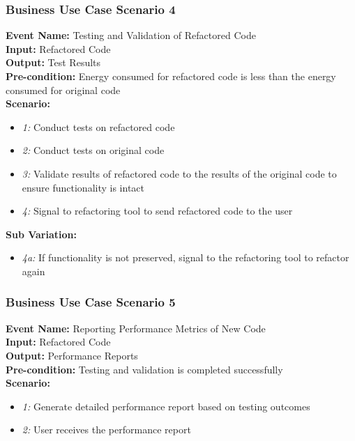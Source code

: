 \documentclass[12pt]{article}
\begin{document}
\subsubsection{Business Use Case Scenario 4} 
\textbf{Event Name:} Testing and Validation of Refactored Code \\
\textbf{Input:} Refactored Code \\
\textbf{Output:} Test Results \\
\textbf{Pre-condition:} Energy consumed for refactored code is less than the energy consumed for original code \\
\textbf{Scenario: } \\
\begin{itemize}
    \item \textit{1:} Conduct tests on refactored code
    \item \textit{2:} Conduct tests on original code
    \item \textit{3:} Validate results of refactored code to the results of the original code to ensure functionality is intact
    \item \textit{4:} Signal to refactoring tool to send refactored code to the user
\end{itemize}
\textbf{Sub Variation: }
\begin{itemize}
    \item \textit{4a:} If functionality is not preserved, signal to the refactoring tool to refactor again
\end{itemize}

\subsubsection{Business Use Case Scenario 5} 
\textbf{Event Name:} Reporting Performance Metrics of New Code \\
\textbf{Input:} Refactored Code \\
\textbf{Output:} Performance Reports\\
\textbf{Pre-condition:} Testing and validation is completed successfully \\
\textbf{Scenario: } \\
\begin{itemize}
    \item \textit{1:} Generate detailed performance report based on testing outcomes
    \item \textit{2:} User receives the performance report
\end{itemize}
\end{document}
